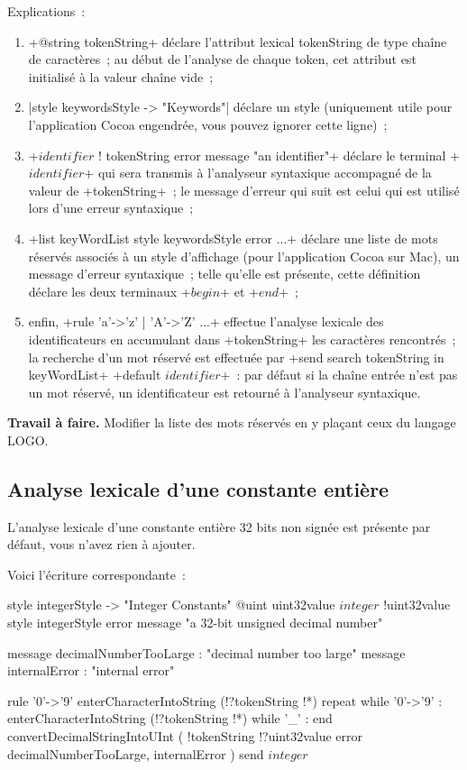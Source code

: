 Explications~:
\begin{enumerate}
  \item \ggst+@string tokenString+ déclare l’attribut lexical tokenString de type chaîne de caractères~; au début de l’analyse de chaque token, cet attribut est initialisé à la valeur chaîne vide~;
  \item \ggst|style keywordsStyle -> "Keywords"| déclare un style (uniquement utile pour l’application Cocoa engendrée, vous pouvez ignorer cette ligne)~;
  \item \ggst+$identifier$ ! tokenString error message "an identifier"+ déclare le terminal \ggst+$identifier$+ qui sera transmis à l’analyseur syntaxique accompagné de la valeur de \ggst+tokenString+~; le message d’erreur qui suit est celui qui est utilisé lors d’une erreur syntaxique~;
  \item \ggst+list keyWordList style keywordsStyle error ...+ déclare une liste de mots réservés associés à un style d’affichage (pour l’application Cocoa sur Mac), un message d’erreur syntaxique~; telle qu’elle est présente, cette définition déclare les deux terminaux \ggst+$begin$+ et \ggst+$end$+~;
  \item enfin, \ggst+rule 'a'->'z' | 'A'->'Z' ...+ effectue l’analyse lexicale des identificateurs en accumulant dans \ggst+tokenString+ les caractères rencontrés~; la recherche d'un mot réservé est effectuée par \ggst+send search tokenString in keyWordList+ \ggst+default $identifier$+~: par défaut si la chaîne entrée n'est pas un mot réservé, un identificateur est retourné à l’analyseur syntaxique.
\end{enumerate}

\textbf{Travail à faire.} Modifier la liste des mots réservés en y plaçant ceux du langage LOGO.

\subsection{Analyse lexicale d'une constante entière}

L’analyse lexicale d’une constante entière 32 bits non signée est présente par défaut, vous n’avez rien à ajouter.

Voici l'écriture correspondante~:
\begin{galgas3}
style integerStyle -> "Integer Constants"
@uint uint32value
$integer$ !uint32value style integerStyle
               error message "a 32-bit unsigned decimal number"

message decimalNumberTooLarge : "decimal number too large"
message internalError : "internal error"

rule '0'->'9' {
  enterCharacterIntoString (!?tokenString !*)
  repeat
  while '0'->'9' :
    enterCharacterIntoString (!?tokenString !*)
  while '_' :
  end
  convertDecimalStringIntoUInt (
    !tokenString
    !?uint32value
    error decimalNumberTooLarge, internalError
  )
  send $integer$
}
\end{galgas3}


